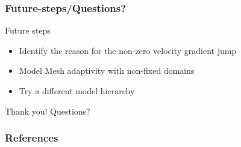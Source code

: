 \documentclass{beamer}
\theoremstyle{definition}
\begin{document}

\begin{frame}
\frametitle{Future-steps/Questions?}
\begin{block}{Future steps}
	\begin{itemize}
\item Identify the reason for the non-zero velocity gradient jump
\item Model Mesh adaptivity with non-fixed domains
\item Try a different model hierarchy
	\end{itemize}
\end{block}
\centering
Thank you! Questions?
\end{frame}


\begin{frame}[allowframebreaks]
\frametitle{References}


\end{frame}
\end{document}
